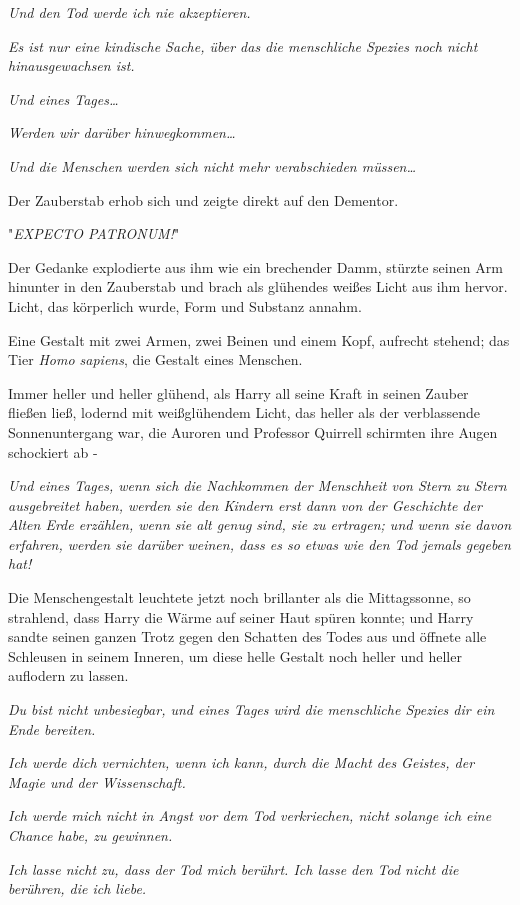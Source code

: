 {\emph{Und den Tod werde ich nie akzeptieren.}

\emph{Es ist nur eine kindische Sache, über das die menschliche Spezies noch nicht hinausgewachsen ist.}

\emph{Und eines Tages…}

\emph{Werden wir darüber hinwegkommen…}

\emph{Und die Menschen werden sich nicht mehr verabschieden müssen…}

Der Zauberstab erhob sich und zeigte direkt auf den Dementor.

"\emph{EXPECTO PATRONUM!}"

Der Gedanke explodierte aus ihm wie ein brechender Damm, stürzte seinen Arm hinunter in den Zauberstab und brach als glühendes weißes Licht aus ihm hervor. Licht, das körperlich wurde, Form und Substanz annahm.

Eine Gestalt mit zwei Armen, zwei Beinen und einem Kopf, aufrecht stehend; das Tier \emph{Homo sapiens}, die Gestalt eines Menschen.

Immer heller und heller glühend, als Harry all seine Kraft in seinen Zauber fließen ließ, lodernd mit weißglühendem Licht, das heller als der verblassende Sonnenuntergang war, die Auroren und Professor Quirrell schirmten ihre Augen schockiert ab -

\emph{Und eines Tages, wenn sich die Nachkommen der Menschheit von Stern zu Stern ausgebreitet haben, werden sie den Kindern erst dann von der Geschichte der Alten Erde erzählen, wenn sie alt genug sind, sie zu ertragen; und wenn sie davon erfahren, werden sie darüber weinen, dass es so etwas wie den Tod jemals gegeben hat!}

Die Menschengestalt leuchtete jetzt noch brillanter als die Mittagssonne, so strahlend, dass Harry die Wärme auf seiner Haut spüren konnte; und Harry sandte seinen ganzen Trotz gegen den Schatten des Todes aus und öffnete alle Schleusen in seinem Inneren, um diese helle Gestalt noch heller und heller auflodern zu lassen.

\emph{Du bist nicht unbesiegbar, und eines Tages wird die menschliche Spezies dir ein Ende bereiten.}

\emph{Ich werde dich vernichten, wenn ich kann, durch die Macht des Geistes, der Magie und der Wissenschaft.}

\emph{Ich werde mich nicht in Angst vor dem Tod verkriechen, nicht solange ich eine Chance habe, zu gewinnen.}

\emph{Ich lasse nicht zu, dass der Tod mich berührt. Ich lasse den Tod nicht die berühren, die ich liebe.}

}
